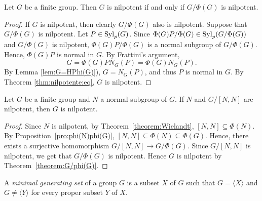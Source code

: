\begin{theorem}
	\label{theorem:G/phi(G)}
	Let $G$ be a finite group. Then $G$ is nilpotent if and only if	$G/\Phi(G)$ is nilpotent.
\end{theorem}

\begin{proof}
	If $G$ is nilpotent, then clearly $G/\Phi(G)$ also is nilpotent. Suppose that $G/\Phi(G)$ is
	nilpotent. Let $P\in\mathrm{Syl}_p(G)$. Since
	$\Phi(G)P/\Phi(G)\in\mathrm{Syl}_p(G/\Phi(G))$ and $G/\Phi(G)$ is nilpotent,
	$\Phi(G)P/\Phi(G)$ is a normal subgroup of $G/\Phi(G)$. Hence,  $\Phi(G)P$ is  normal in $G$.
	By Frattini's argument,  
	\[
		G=\Phi(G)PN_G(P)=\Phi(G)N_G(P).
	\]
	By Lemma \ref{lem:G=HPhi(G)}),  $G=N_G(P)$, and thus $P$ is normal in $G$. By Theorem \ref{thm:nilpotente:eq}, $G$ is nilpotent.
\end{proof}

\begin{theorem}[Hall]
	\label{theorem:Hall_nilpotente}
	Let $G$ be a finite group and $N$ a normal subgroup of $G$. If $N$ and
	$G/[N,N]$ are nilpotent, then $G$ is nilpotent.
\end{theorem}

\begin{proof}
	Since $N$ is nilpotent, by Theorem~\ref{theorem:Wielandt}, $[N,N]\subseteq\Phi(N)$.
	By Proposition~\ref{pro:phi(N)phi(G)},
	$[N,N]\subseteq\Phi(N)\subseteq\Phi(G)$. 
	Hence, there exists a surjective homomorphism
	$G/[N,N]\to G/\Phi(G)$. Since $G/[N,N]$ is nilpotent, we get that $G/\Phi(G)$ is nilpotent.
Hence $G$ is nilpotent by Theorem~\ref{theorem:G/phi(G)}.
\end{proof}

\begin{definition}
	A {\em minimal generating set} of a group $G$ is a subset $X$ of $G$ such that $G=\langle X\rangle$ and $G\neq \langle Y\rangle$ for every proper subset $Y$ of $X$.
\end{definition}

